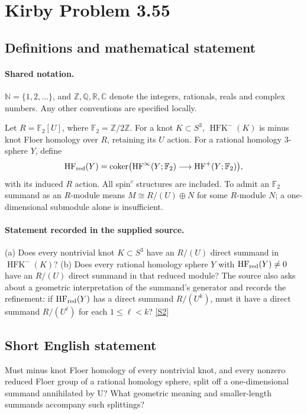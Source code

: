 \documentclass[11pt]{article}
\newcommand{\sref}[2]{\hyperlink{source:#1:#2}{[S#2]}}
\begin{document}
\section{Kirby Problem 3.55}\label{statement}

\subsection{Definitions and mathematical statement}

\paragraph{Shared notation.}$\mathbb N=\{1,2,\ldots\}$, and $\mathbb Z,\mathbb Q,\mathbb R,\mathbb C$ denote the integers, rationals, reals and complex numbers. Any other conventions are specified locally.


Let $R=\mathbb F_2[U]$, where $\mathbb F_2=\mathbb Z/2\mathbb Z$. For a knot $K\subset S^3$, $\operatorname{HFK}^-(K)$ is minus knot Floer homology over $R$, retaining its $U$ action. For a rational homology $3$-sphere $Y$, define
\[
\operatorname{HF}_{\rm red}(Y)=\operatorname{coker}\bigl(\operatorname{HF}^{\infty}(Y;\mathbb F_2)\longrightarrow\operatorname{HF}^{+}(Y;\mathbb F_2)\bigr),
\]
with its induced $R$ action. All spin$^c$ structures are included. To admit an $\mathbb F_2$ summand as an $R$-module means $M\cong R/(U)\oplus N$ for some $R$-module $N$; a one-dimensional submodule alone is insufficient.
\paragraph{Statement recorded in the supplied source.}
(a) Does every nontrivial knot $K\subset S^3$ have an $R/(U)$ direct summand in $\operatorname{HFK}^-(K)$? (b) Does every rational homology sphere $Y$ with $\operatorname{HF}_{\rm red}(Y)\ne0$ have an $R/(U)$ direct summand in that reduced module?
The source also asks about a geometric interpretation of the summand's generator and records the refinement: if $\operatorname{HF}_{\rm red}(Y)$ has a direct summand $R/(U^k)$, must it have a direct summand $R/(U^\ell)$ for each $1\le\ell<k$? \sref{statement}{2}
\subsection{Short English statement}
Must minus knot Floer homology of every nontrivial knot, and every nonzero reduced Floer group of a rational homology sphere, split off a one-dimensional summand annihilated by U? What geometric meaning and smaller-length summands accompany such splittings?
\end{document}
